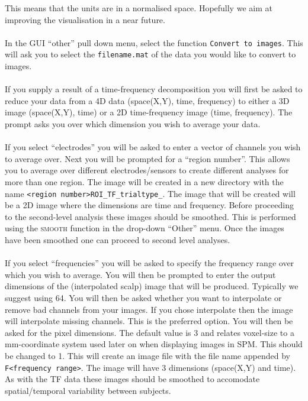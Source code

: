 This means that the units are in a normalised space. Hopefully we aim at improving the visualisation in a near future.
\\
\\
In the GUI ``other'' pull down menu, select the function \texttt{Convert to images}. This will ask you to select the \texttt{filename.mat} of the data you would like to convert to images.
\\
\\
If you supply a result of a time-frequency decomposition you will first be asked to reduce your data from a 4D data (space(X,Y), time, frequency) to either a 3D image (space(X,Y), time) or a 2D time-frequency image (time, frequency). The prompt asks you over which dimension you wish to average your data.
\\
\\
If you select ``electrodes'' you will be asked to enter a vector of channels you wish to average over. Next you will be prompted for a ``region number''. This allows you to average over different electrodes/sensors to create different analyses for more than one region. The image will be created in a new directory with the name \texttt{<region number>ROI\_TF\_trialtype\_<condition number>}. The image that will be created will be a 2D image where the dimensions are time and frequency. Before proceeding to the second-level analysis these images should be smoothed. This is performed using the \textsc{smooth} function in the drop-down ``Other'' menu. Once the images have been smoothed one can proceed to second level analyses.
\\
\\
If you select ``frequencies'' you will be asked to specify the frequency range over which you wish to average. You will then be prompted to enter the output dimensions of the (interpolated scalp) image that will be produced. Typically we suggest using 64.  You will then be asked whether you want to interpolate or remove bad channels from your images. If you chose interpolate then the image will interpolate missing channels. This is the preferred option. You will then be asked for the pixel dimensions. The default value is 3 and relates voxel-size to a mm-coordinate system used later on when displaying images in SPM. This should be changed to 1. This will create an image file with the file name appended by \texttt{F<frequency range>}. The image will have 3 dimensions (space(X,Y) and time). As with the TF data these images should be smoothed to accomodate spatial/temporal variability between subjects.

